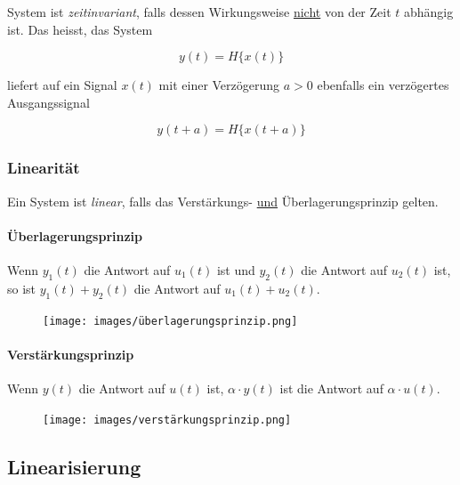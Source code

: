 \documentclass[
  10pt,
  a4paper,
  twocolumn]{article}
\let\oldparagraph\paragraph
\renewcommand{\paragraph}[1]{\oldparagraph{#1}\mbox{}}
\numberwithin{equation}{section}
\let\paragraph\oldparagraph
\renewcommand{\paragraph}[1]{\oldparagraph{#1}\mbox{}\par}
\begin{document}
System ist \emph{zeitinvariant}, falls dessen Wirkungsweise \ul{nicht}
von der Zeit \(t\) abhängig ist. Das heisst, das System

\[ y(t) = H\{x(t)\} \]

liefert auf ein Signal \(x(t)\) mit einer Verzögerung \(a>0\) ebenfalls
ein verzögertes Ausgangssignal

\[ y(t+a)=H\{x(t+a)\} \]

\hypertarget{linearituxe4t}{%
\subsubsection{Linearität}\label{linearituxe4t}}

Ein System ist \emph{linear}, falls das Verstärkungs- \ul{und}
Überlagerungsprinzip gelten.

\hypertarget{uxfcberlagerungsprinzip}{%
\paragraph{Überlagerungsprinzip}\label{uxfcberlagerungsprinzip}}

Wenn \(y_1(t)\) die Antwort auf \(u_1(t)\) ist und \(y_2(t)\) die
Antwort auf \(u_2(t)\) ist, so ist \(y_1(t) + y_2(t)\) die Antwort auf
\(u_1(t) + u_2(t)\).

\begin{figure}[H]

{\centering \texttt{[image: images/überlagerungsprinzip.png]}

}

\end{figure}

\hypertarget{verstuxe4rkungsprinzip}{%
\paragraph{Verstärkungsprinzip}\label{verstuxe4rkungsprinzip}}

Wenn \(y(t)\) die Antwort auf \(u(t)\) ist, \(\alpha\cdot y(t)\) ist die
Antwort auf \(\alpha\cdot u(t)\).

\begin{figure}[H]

{\centering \texttt{[image: images/verstärkungsprinzip.png]}

}

\end{figure}

\hypertarget{linearisierung-1}{%
\subsection{Linearisierung}\label{linearisierung-1}}
\end{document}
